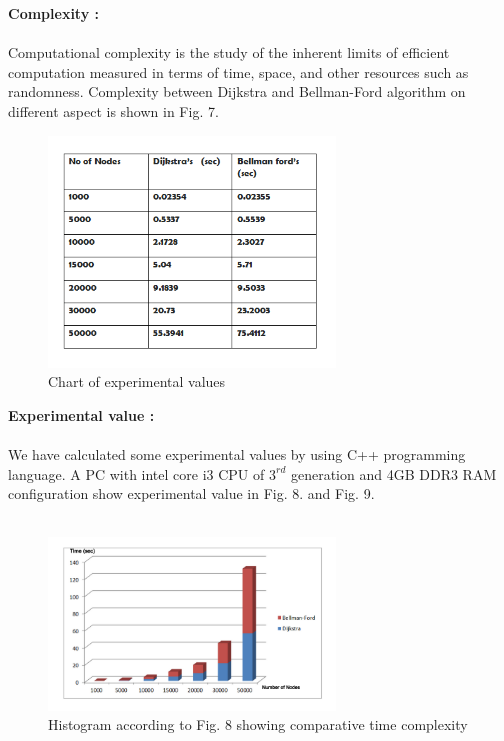 \documentclass[a4paper,10pt]{article}
\begin{document}
\textbf{Complexity :}\\\\
Computational complexity is the study of the inherent limits of efficient computation measured in terms of time, space, and other resources such as randomness. Complexity between Dijkstra and Bellman-Ford algorithm on different aspect is shown in Fig. 7.\\

\begin{figure}[h]
 \centering
  \includegraphics[width=3.0in]{comfigd.png}
    \caption{Chart of experimental values}
  \label{fig:com fig d}
\end{figure}

\textbf{Experimental value : }\\\\
We have calculated some experimental values by using C++ programming language. A PC with intel core i3 CPU of $3^{rd}$ generation and 4GB DDR3 RAM configuration show experimental value in Fig. 8. and Fig. 9.\\\\
\begin{figure}[h]
 \centering
  \includegraphics[width=3.0in]{comfige.png}
    \caption{Histogram according to Fig. 8 showing comparative time complexity}
  \label{fig:com fig e}
\end{figure}\\
\end{document}
